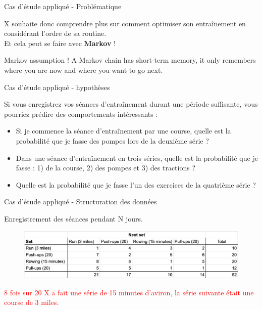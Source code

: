 \documentclass[aspectratio=169,xcolor=dvipsnames, t]{beamer}
\begin{document}
\begin{frame}{Cas d'étude appliqué - Problématique}

	X souhaite donc comprendre plus sur comment optimiser son entraînement en considérant l'ordre de sa routine.\\
	
	Et cela peut se faire avec \textbf{Markov} !
	
	\begin{alertblock}{Markov assumption !}
		A Markov chain has short-term memory, it only remembers where you are now and where you want to go next.
	\end{alertblock}
	
\end{frame}


\begin{frame}{Cas d'étude appliqué - hypothèses}
	
	Si vous enregistrez vos séances d'entraînement durant une période suffisante, vous pourriez prédire des comportements intéressants :
	
	\begin{itemize}
		\item Si je commence la séance d'entraînement par une course, quelle est la probabilité que je fasse des pompes lors de la deuxième série ?
		\item Dans une séance d'entraînement en trois séries, quelle est la probabilité que je fasse : 1) de la course, 2) des pompes et 3) des tractions ?
		\item Quelle est la probabilité que je fasse l'un des exercices de la quatrième série ?
	\end{itemize}
	
	
\end{frame}
\begin{frame}{Cas d'étude appliqué - Structuration des données}
	
	Enregistrement des séances pendant N jours.
	\vspace{0.5cm}
	\begin{figure}
		\includegraphics[height=0.35\paperheight]{figures/entrainementLogs.png}
	\end{figure}
	\textcolor{red}{8 fois sur 20 X a fait une série de 15 minutes d'aviron, la série suivante était une course de 3 miles.}

\end{frame}
\end{document}
